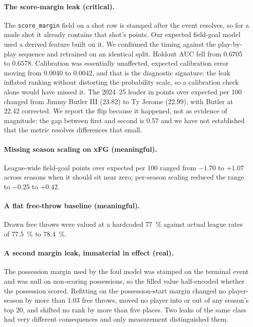 \documentclass[11pt,letterpaper]{article}
\begin{document}
\paragraph{The score-margin leak (critical).} The \texttt{score\_margin} field on
a shot row is stamped after the event resolves, so for a made shot it already
contains that shot's points. Our expected field-goal model used a derived feature
built on it. We confirmed the timing against the play-by-play sequence and
retrained on an identical split. Holdout AUC fell from 0.6705 to 0.6578.
Calibration was essentially unaffected, expected calibration error moving from
0.0040 to 0.0042, and that is the diagnostic signature: the leak inflated ranking
without distorting the probability scale, so a calibration check alone would have
missed it. The 2024--25 leader in points over expected per 100 changed from Jimmy
Butler III (23.82) to Ty Jerome (22.99), with Butler at 22.42 corrected. We report
the flip because it happened, not as evidence of magnitude: the gap between first
and second is 0.57 and we have not established that the metric resolves
differences that small.

\paragraph{Missing season scaling on xFG (meaningful).} League-wide field-goal
points over expected per 100 ranged from $-1.70$ to $+1.07$ across seasons when it
should sit near zero; per-season scaling reduced the range to $-0.25$ to $+0.42$.

\paragraph{A flat free-throw baseline (meaningful).} Drawn free throws were valued
at a hardcoded \SI{77}{\percent} against actual league rates of
\SI{77.5}{\percent} to \SI{78.4}{\percent}.

\paragraph{A second margin leak, immaterial in effect (real).} The possession
margin used by the foul model was stamped on the terminal event and was null on
non-scoring possessions, so the filled value half-encoded whether the possession
scored. Refitting on the possession-start margin changed no player-season by more
than 1.03 free throws, moved no player into or out of any season's top 20, and
shifted no rank by more than five places. Two leaks of the same class had very
different consequences and only measurement distinguished them.
\end{document}
